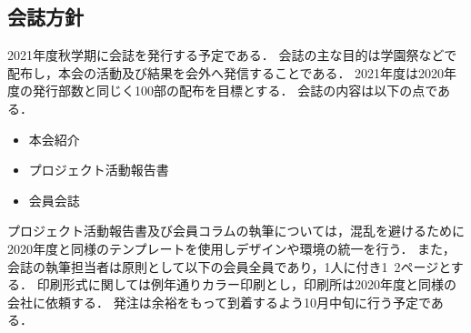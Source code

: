 \subsection*{会誌方針}


2021年度秋学期に会誌を発行する予定である．
会誌の主な目的は学園祭などで配布し，本会の活動及び結果を会外へ発信することである．
2021年度は2020年度の発行部数と同じく100部の配布を目標とする．
会誌の内容は以下の点である．
\begin{itemize}
	\item 本会紹介
	\item プロジェクト活動報告書
	\item 会員会誌
\end{itemize}
プロジェクト活動報告書及び会員コラムの執筆については，混乱を避けるために2020年度と同様のテンプレートを使用しデザインや環境の統一を行う．
また，会誌の執筆担当者は原則として\thirdGrade{}以下の会員全員であり，1人に付き1~2ページとする．
印刷形式に関しては例年通りカラー印刷とし，印刷所は2020年度と同様の会社に依頼する．
発注は余裕をもって到着するよう10月中旬に行う予定である．
